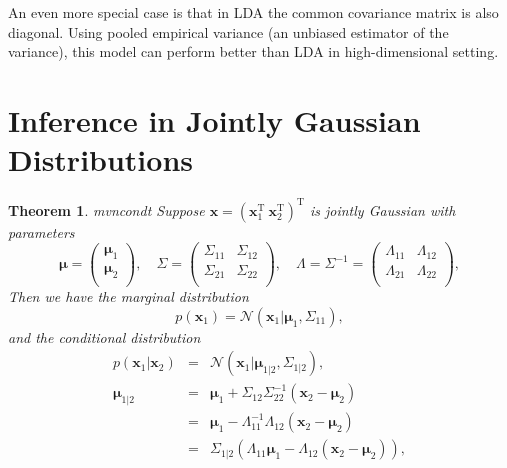 \documentclass[openany]{book}
\newtheorem{theorem}{Theorem}[chapter]
\begin{document}
An even more special case is that in LDA the common covariance matrix is also diagonal. Using pooled empirical variance (an unbiased estimator of the variance), this model can perform better than LDA in high-dimensional setting.

\section{Inference in Jointly Gaussian Distributions}
\begin{theorem}{mvncondt}
Suppose $\mathbf{x}=(\mathbf{x}_1^{\mathrm{T}}\ \mathbf{x}_2^{\mathrm{T}})^{\mathrm{T}}$ is jointly Gaussian with parameters
\begin{equation}\label{jointmvn}
\boldsymbol{\mu}=\left(
\begin{array}{c}
\boldsymbol{\mu}_1 \\
\boldsymbol{\mu}_2 \\
\end{array}
\right),\quad
\Sigma=\left(
\begin{array}{cc}
\Sigma_{11} & \Sigma_{12} \\
\Sigma_{21} & \Sigma_{22} \\
\end{array}
\right),\quad
\Lambda=\Sigma^{-1}=\left(
\begin{array}{cc}
\Lambda_{11} & \Lambda_{12} \\
\Lambda_{21} & \Lambda_{22} \\
\end{array}
\right),
\end{equation}
Then we have the marginal distribution
\begin{equation}\label{mvnmargin}
p(\mathbf{x}_1)=\mathcal{N}(\mathbf{x}_1|\boldsymbol{\mu}_1,\Sigma_{11}),
\end{equation}
and the conditional distribution
\begin{equation}\label{mvncond}
\begin{array}{rcl}
p(\mathbf{x}_1|\mathbf{x}_2) & = & \mathcal{N}(\mathbf{x}_1|\boldsymbol{\mu}_{1|2},\Sigma_{1|2}), \\
\boldsymbol{\mu}_{1|2} & = & \boldsymbol{\mu}_1+\Sigma_{12}\Sigma_{22}^{-1}(\mathbf{x}_2-\boldsymbol{\mu}_2) \\
 & = & \boldsymbol{\mu}_1-\Lambda_{11}^{-1}\Lambda_{12}(\mathbf{x}_2-\boldsymbol{\mu}_2) \\
 & = & \Sigma_{1|2}(\Lambda_{11}\boldsymbol{\mu}_1-\Lambda_{12}(\mathbf{x}_2-\boldsymbol{\mu}_2)), \\

\end{array}
\end{equation}
\end{theorem}
\end{document}
